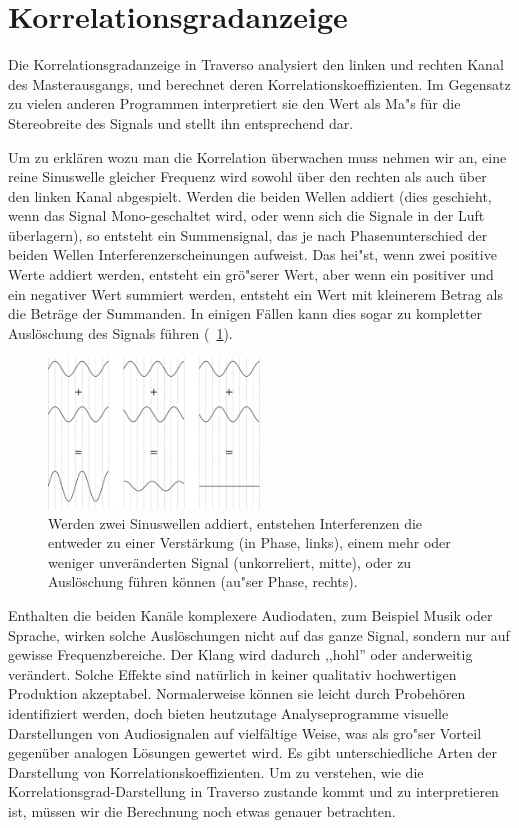 \section{Korrelationsgradanzeige}
Die Korrelationsgradanzeige in Traverso analysiert den linken und rechten Kanal des Masterausgangs, und berechnet deren Korrelationskoeffizienten. Im Gegensatz zu vielen anderen Programmen interpretiert sie den Wert als Ma"s für die Stereobreite des Signals und stellt ihn entsprechend dar.

Um zu erklären wozu man die Korrelation überwachen muss nehmen wir an, eine reine Sinuswelle gleicher Frequenz wird sowohl über den rechten als auch über den linken Kanal abgespielt. Werden die beiden Wellen addiert (dies geschieht, wenn das Signal Mono-geschaltet wird, oder wenn sich die Signale in der Luft überlagern), so entsteht ein Summensignal, das je nach Phasenunterschied der beiden Wellen Interferenzerscheinungen aufweist. Das hei"st, wenn zwei positive Werte addiert werden, entsteht ein grö"serer Wert, aber wenn ein positiver und ein negativer Wert summiert werden, entsteht ein Wert mit kleinerem Betrag als die Beträge der Summanden. In einigen Fällen kann dies sogar zu kompletter Auslöschung des Signals führen (\FigB\ \ref{fig_interference}).

\begin{figure}
	\centering\includegraphics[width=0.5\textwidth]{../images/sine01}
	\caption{Werden zwei Sinuswellen addiert, entstehen Interferenzen die entweder zu einer Verstärkung (in Phase, links), einem mehr oder weniger unveränderten Signal (unkorreliert, mitte), oder zu Auslöschung führen können (au"ser Phase, rechts).}
	\label{fig_interference}
\end{figure}

Enthalten die beiden Kanäle komplexere Audiodaten, zum Beispiel Musik oder Sprache, wirken solche Auslöschungen nicht auf das ganze Signal, sondern nur auf gewisse Frequenzbereiche. Der Klang wird dadurch ,,hohl'' oder anderweitig verändert. Solche Effekte sind natürlich in keiner qualitativ hochwertigen Produktion akzeptabel. Normalerweise können sie leicht durch Probehören identifiziert werden, doch bieten heutzutage Analyseprogramme visuelle Darstellungen von Audiosignalen auf vielfältige Weise, was als gro"ser Vorteil gegenüber analogen Lösungen gewertet wird. Es gibt unterschiedliche Arten der Darstellung von Korrelationskoeffizienten. Um zu verstehen, wie die Korrelationsgrad-Darstellung in Traverso zustande kommt und zu interpretieren ist, müssen wir die Berechnung noch etwas genauer betrachten.

